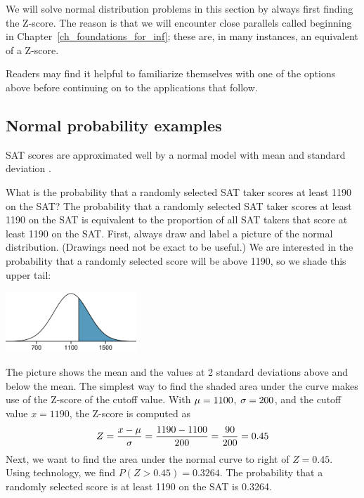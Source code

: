 We will solve normal distribution problems in this section
by always first finding the Z-score.
The reason is that we will encounter close parallels
called 
beginning in Chapter~\ref{ch_foundations_for_inf};
these are, in many instances, an equivalent of a Z-score.  

Readers may find it helpful to familiarize themselves with one of the options above before continuing on to the applications that follow.  


\B{\newpage}
\subsection{Normal probability examples}

 SAT scores are approximated well by a normal model with mean \satmean{} and standard deviation \satsd{}.

\begin{examplewrap}
\begin{nexample}{What is the probability that a randomly selected SAT taker scores at least 1190 on the SAT?}\label{satAbove1190Exam}
The probability that a randomly selected SAT taker scores at least 1190 on the SAT is equivalent to the proportion of all SAT takers that score at least 1190 on the SAT. First, always draw and label a picture of the normal distribution. (Drawings need not be exact to be useful.) We are interested in the probability that a randomly selected score will be above 1190, so we shade this upper tail:
\begin{center}
\includegraphics[height=0.9in]{ch_distributions/figures/satAbove1190/satAbove1190}
\end{center}
The picture shows the mean and the values at 2 standard deviations above and below the mean. The simplest way to find the shaded area under the curve makes use of the Z-score of the cutoff value. With $\mu=1100{}$, $\sigma=200{}$, and the cutoff value $x=1190$, the Z-score is computed as
\begin{eqnarray*}
Z = \frac{x - \mu}{\sigma} = \frac{1190 - 1100{}}{200{}} = \frac{90}{200} = 0.45
\end{eqnarray*}
Next, we want to find the area under the normal curve to right of  $Z=0.45$.  Using technology, we find $P(Z > 0.45) = 0.3264$. 
The probability that a randomly selected score is at least 1190 on the SAT is 0.3264.
\end{nexample}
\end{examplewrap}


